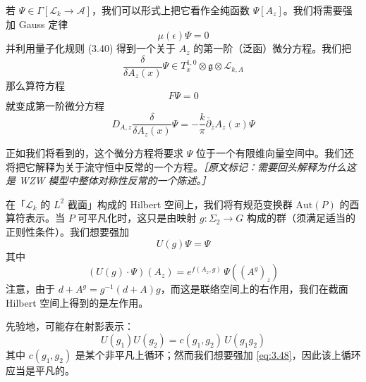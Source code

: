 若 $\Psi\in\Gamma[\mathcal{L}_{k}\to\mathcal{A}]$，我们可以形式上把它看作全纯函数 $\Psi[A_{z}]$。我们将需要强加 Gauss 定律
\begin{equation}
  \mu(\epsilon)\Psi=0
  \tag{3.44}
  \label{eq:3.44}
\end{equation}
并利用量子化规则 (3.40) 得到一个关于 $A_{z}$ 的第一阶（泛函）微分方程。我们把
\begin{equation}
  \frac{\delta}{\delta A_{z}(x)}\Psi\in T^{1,0}_{x}\otimes\mathfrak{g}\otimes\mathcal{L}_{k,A}
  \tag{3.45}
  \label{eq:3.45}
\end{equation}
那么算符方程
\begin{equation}
  F\Psi=0
  \tag{3.46}
  \label{eq:3.46}
\end{equation}
就变成第一阶微分方程
\begin{equation}
  D_{A,z}\frac{\delta}{\delta A_{z}(x)}\Psi=-\frac{k}{\pi}\bar\partial_{\bar z}A_{z}(x)\Psi
  \tag{3.47}
  \label{eq:3.47}
\end{equation}

正如我们将看到的，这个微分方程将要求 $\Psi$ 位于一个有限维向量空间中。我们还将把它解释为关于流守恒中反常的一个方程。{\small\itshape ［原文标记：需要回头解释为什么这是 WZW 模型中整体对称性反常的一个陈述。］}

在「$\mathcal{L}_{k}$ 的 $L^{2}$ 截面」构成的 Hilbert 空间上，我们将有规范变换群 $\mathrm{Aut}(P)$ 的酉算符表示。当 $P$ 可平凡化时，这只是由映射 $g:\Sigma_2\to G$ 构成的群（须满足适当的正则性条件）。我们想要强加
\begin{equation}
  U(g)\Psi=\Psi
  \tag{3.48}
  \label{eq:3.48}
\end{equation}
其中
\begin{equation}
  (U(g)\cdot\Psi)(A_{z})=e^{f(A_{z},g)}\,\Psi((A^{g})_{z})
  \tag{3.49}
  \label{eq:3.49}
\end{equation}
注意，由于 $d+A^{g}=g^{-1}(d+A)g$，而这是联络空间上的右作用，我们在截面 Hilbert 空间上得到的是左作用。

先验地，可能存在射影表示：
\begin{equation}
  U(g_{1})U(g_{2})=c(g_{1},g_{2})\,U(g_{1}g_{2})
  \tag{3.50}
  \label{eq:3.50}
\end{equation}
其中 $c(g_{1},g_{2})$ 是某个非平凡上循环；然而我们想要强加 \eqref{eq:3.48}，因此该上循环应当是平凡的。

